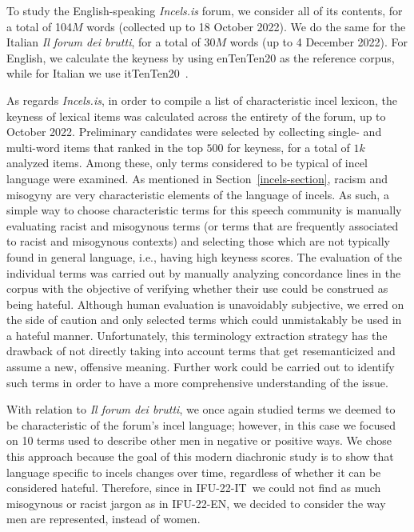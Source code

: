 \documentclass[11pt]{article}
\newcommand{\paolo}[1]{{\color{red} #1}}
\newcommand{\dsENcorpus}{IFU-22-EN}
\newcommand{\dsITcorpus}{IFU-22-IT}
\newcommand{\enforum}{\textit{Incels.is}}
\newcommand{\itforum}{\textit{Il forum dei brutti}}
\begin{document}
To study the English-speaking \textit{Incels.is} forum, we consider \paolo{all of its contents, for a total of}
104$M$ words (collected up to 18 October 2022).
\paolo{We do the same for the}
Italian \textit{Il forum dei brutti},
\paolo{for a total of}
30$M$ words (up to 4 December 2022). For English, we calculate the keyness by using 
enTenTen20
as the reference corpus, while for Italian we use itTenTen20~\cite{tenten2013kilgarriff}.

As regards \enforum, in order to compile a list of characteristic incel lexicon, the keyness of lexical items was calculated across the entirety of the forum, up to October 2022. Preliminary candidates were selected by 
collecting single- and multi-word items that ranked in the top $500$ for keyness, for a total of $1k$ analyzed items.  Among these, only terms considered to be typical of incel language were examined. As mentioned in Section~\ref{incels-section}, racism and misogyny are very characteristic elements of the language of incels. As such, a simple way to choose characteristic terms for this speech community is manually evaluating racist and misogynous terms (or terms that are frequently associated to racist and misogynous contexts) and selecting those which are not typically found in general language, i.e., having high keyness scores.
The evaluation of the individual terms was carried out by manually analyzing concordance lines in the corpus with the objective of verifying whether their use could be construed as being hateful. Although human evaluation is unavoidably subjective, we erred on the side of caution and only selected terms which could unmistakably be used in a hateful manner. Unfortunately, this terminology extraction strategy has the drawback of not directly taking into account terms that get resemanticized and assume a new, offensive meaning. Further work could be carried out to identify such terms in order to have a more comprehensive understanding of the issue.

With relation to \itforum, we once again studied terms we deemed to be characteristic of the forum's incel language; however, in this case we focused on 10 terms used to describe other men in negative or positive ways. We chose this approach because the goal of this modern diachronic study is to show that language specific to incels changes over time, regardless of whether it can be considered hateful. Therefore, since in \dsITcorpus\, we could not find as much misogynous or racist jargon as in \dsENcorpus, we decided to consider the way men are represented, instead of women.
\end{document}
